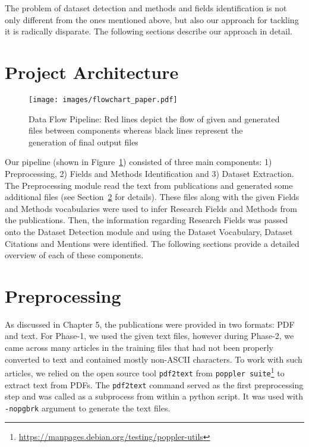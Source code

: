 \documentclass[runningheads]{llncs}
\begin{document}
The problem of dataset detection and methods and fields identification is not only different from the ones mentioned above, but also our approach for tackling it is radically disparate. The following sections describe our approach in detail.

\section{Project Architecture}

\begin{figure}[!htb]
    \centering
    \texttt{[image: images/flowchart\_paper.pdf]}
    \caption{Data Flow Pipeline: Red lines depict the flow of given and generated files between components whereas black lines represent the generation of final output files}
    \label{fig:flowchart}
\end{figure}

Our pipeline (shown in Figure~\ref{fig:flowchart}) consisted of three main components: 1) Preprocessing, 2) Fields and Methods Identification and 3) Dataset Extraction. The Preprocessing module read the text from publications and generated some additional files (see Section~\ref{preprocess} for details). These files along with the given Fields and Methods vocabularies were used to infer Research Fields and Methods from the publications. Then, the information regarding Research Fields was passed onto the Dataset Detection module and using the Dataset Vocabulary, Dataset Citations and Mentions were identified. The following sections provide a detailed overview of each of these components. 

\section{Preprocessing} \label{preprocess}

As discussed in Chapter 5, the publications were provided in two formats: PDF and text. %
For Phase-1, we used the given text files, however during Phase-2, we came across many articles in the training files that had not been properly converted to text and contained mostly non-ASCII characters. To work with such articles, we relied on the open source tool \texttt{pdf2text} from \texttt{poppler suite}\footnote{\label{poppler}\url{https://manpages.debian.org/testing/poppler-utils}} to extract text from PDFs. The \texttt{pdf2text} command served as the first preprocessing step and was called as a subprocess from within a python script. It was used with \texttt{-nopgbrk} argument to generate the text files. 
\end{document}

